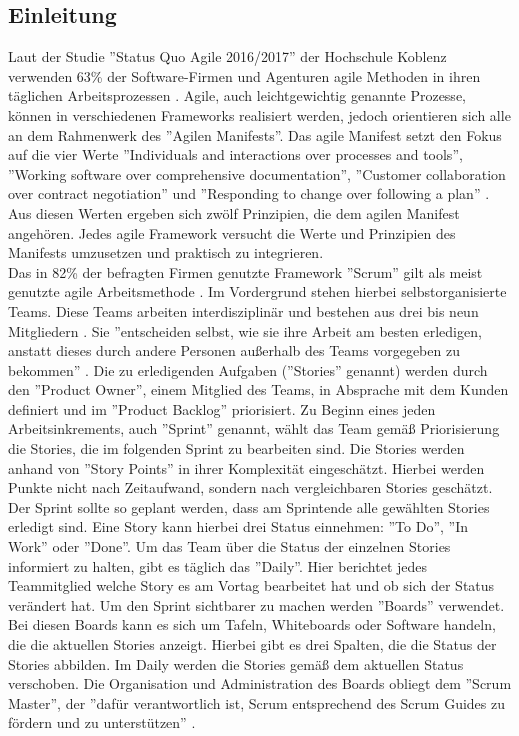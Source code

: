 \documentclass[12pt,titlepage]{scrartcl}
\begin{document}
		\subsection{Einleitung}
		Laut der Studie ''Status Quo Agile 2016/2017'' der Hochschule Koblenz verwenden 63\% der 				Software-Firmen und Agenturen agile Methoden in ihren täglichen Arbeitsprozessen 						\cite{hskob}. 
		Agile, auch leichtgewichtig genannte Prozesse, können in verschiedenen Frameworks realisiert 			werden, jedoch orientieren sich alle an dem Rahmenwerk des ''Agilen Manifests''. Das agile 				Manifest setzt den Fokus auf die vier Werte ''Individuals and interactions over processes and 		tools'', ''Working software over comprehensive documentation'', ''Customer collaboration over 		contract negotiation'' und ''Responding to change over following a plan'' \cite{manifest}. 				Aus diesen Werten 			ergeben sich zwölf Prinzipien, die dem agilen Manifest angehören. 		Jedes agile Framework 				versucht die Werte und Prinzipien des Manifests 					umzusetzen und praktisch zu integrieren. \\
		Das in 82\% der befragten Firmen genutzte Framework ''Scrum'' gilt als meist genutzte agile 			Arbeitsmethode \cite{hskob}. Im Vordergrund stehen hierbei selbstorganisierte Teams. Diese 				Teams arbeiten interdisziplinär und bestehen aus drei bis neun Mitgliedern \cite{guide}. Sie 			''entscheiden selbst, wie sie ihre Arbeit am besten erledigen, anstatt dieses durch andere
		Personen außerhalb des Teams vorgegeben zu bekommen'' \cite{guide}. Die zu erledigenden 				Aufgaben (''Stories'' genannt) werden durch den ''Product Owner'', einem Mitglied des Teams, 			in Absprache mit dem Kunden definiert und im ''Product Backlog'' priorisiert. Zu Beginn eines 		jeden Arbeitsinkrements, auch ''Sprint'' genannt, wählt das Team gemäß Priorisierung die 				Stories, die 		im folgenden Sprint zu bearbeiten sind. Die Stories werden anhand von 				''Story Points'' in ihrer Komplexität eingeschätzt. Hierbei werden Punkte nicht nach 					Zeitaufwand, sondern nach vergleichbaren Stories geschätzt. Der Sprint sollte so geplant 				werden, dass am Sprintende alle gewählten Stories erledigt sind. Eine Story kann hierbei drei 		Status einnehmen: ''To Do'', ''In Work'' oder ''Done''. Um das Team über die Status der 				einzelnen Stories informiert zu halten, gibt es täglich das ''Daily''. Hier berichtet jedes 			Teammitglied welche Story es am Vortag bearbeitet hat und ob sich der Status verändert hat. 			Um den Sprint sichtbarer zu machen werden ''Boards'' verwendet. Bei diesen Boards kann es 				sich um Tafeln, Whiteboards oder Software handeln, die die aktuellen Stories anzeigt. Hierbei 		gibt es drei Spalten, die die Status der Stories abbilden. Im Daily werden die Stories gemäß 			dem aktuellen Status verschoben. Die Organisation und Administration des Boards obliegt dem 			''Scrum Master'', der ''dafür verantwortlich ist, Scrum entsprechend des Scrum Guides zu 				fördern	und zu unterstützen'' \cite{guide}. \\
\end{document}
